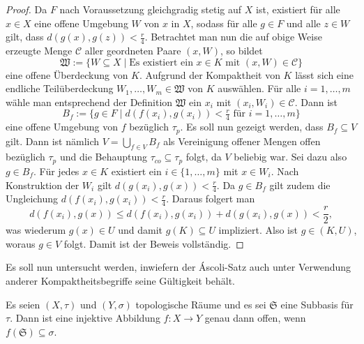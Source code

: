 \begin{proof}
  Da $F$ nach Voraussetzung gleichgradig stetig auf $X$ ist, existiert für alle $x \in X$ eine offene Umgebung $W$ von $x$ in $X$, sodass für alle $g \in F$ und alle $z \in W$ gilt, dass $d(g(x),g(z)) < \tfrac{r}{4}$.
  Betrachtet man nun die auf obige Weise erzeugte Menge $\mathcal{C}$ aller geordneten Paare $(x,W)$, so bildet
  \begin{displaymath}
    \mathfrak{W} := \{W \subseteq X \mid \text{Es existiert ein $x \in K$ mit $(x,W) \in \mathcal{C}$} \}
  \end{displaymath}
  eine offene Überdeckung von $K$.
  Aufgrund der Kompaktheit von $K$ lässt sich eine endliche Teilüberdeckung $W_1,\dots,W_m \in \mathfrak{W}$ von $K$ auswählen.
  Für alle $i = 1,\dots,m$ wähle man entsprechend der Definition $\mathfrak{W}$ ein $x_i$ mit $(x_i,W_i) \in \mathcal{C}$.
  Dann ist
  \begin{displaymath}
    B_f := \{ g \in F \mid d(f(x_i),g(x_i)) < \tfrac{r}{4} \text{ für } i = 1,\dots,m\}
  \end{displaymath}
  eine offene Umgebung von $f$ bezüglich $\tau_p$.
  Es soll nun gezeigt werden, dass $B_f \subseteq V$ gilt.
  Dann ist nämlich $V = \bigcup_{f \in V} B_f$ als Vereinigung offener Mengen offen bezüglich $\tau_p$ und die Behauptung $\tau_{co} \subseteq \tau_p$ folgt, da $V$ beliebig war.
  Sei dazu also $g \in B_f$.
  Für jedes $x \in K$ existiert ein $i \in \{1,\dots,m\}$ mit $x \in W_i$.
  Nach Konstruktion der $W_i$ gilt $d(g(x_i),g(x)) < \tfrac{r}{4}$.
  Da $g \in B_f$ gilt zudem die Ungleichung $d(f(x_i),g(x_i)) < \tfrac{r}{4}$.
  Daraus folgert man
  \begin{displaymath}
    d(f(x_i),g(x)) \leq d(f(x_i),g(x_i)) + d(g(x_i),g(x)) < \frac{r}{2},
  \end{displaymath}
  was wiederum $g(x) \in U$ und damit $g(K) \subseteq U$ impliziert. 
  Also ist $g \in (K,U)$, woraus $g \in V$ folgt.
  Damit ist der Beweis vollständig.
\end{proof}

Es soll nun untersucht werden, inwiefern der Áscoli-Satz auch unter Verwendung anderer Kompaktheitsbegriffe seine Gültigkeit behält.

\begin{lem}
  \label{lem:openmap}
  Es seien $(X,\tau)$ und $(Y,\sigma)$ topologische Räume und es sei $\mathfrak{S}$ eine Subbasis für $\tau$.  
  Dann ist eine injektive Abbildung $f \colon X \to Y$ genau dann offen, wenn $f(\mathfrak{S}) \subseteq \sigma$.
\end{lem}


